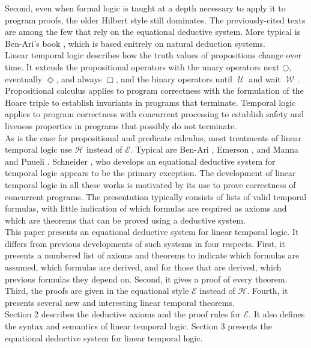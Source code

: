 \documentclass[fleqn, leqno]{article}
\newcommand{\Until}{\;\mathcal{U}\;}
\newcommand{\Wait}{\;\mathcal{W}\;}
\newcommand{\Next}{\bigcirc}
\newcommand{\Event}{\Diamond}
\newcommand{\Always}{\Box}
\begin{document}
Second, even when formal logic is taught at a depth necessary to apply it to program proofs, the older Hilbert style
still dominates.
The previously-cited texts \cite{Cohen, LADM, Kald} are among the few that rely on the equational deductive system. 
More typical is Ben-Ari's book \cite{Ben}, which is based enitrely on natural deduction systems.\\

Linear temporal logic describes how the truth values of propositions change over time.
It extends the propositional operators with the unary operators next $\Next$, eventually $\Event$, and always $\Always$,
and the binary operators until $\Until$ and wait $\Wait$.
Propositional calculus applies to program correctness with the formulation of the Hoare triple to establish invariants
in programs that terminate.
Temporal logic applies to program correctness with concurrent processing to establish safety and liveness properties
in programs that possibly do not terminate.\\

As is the case for propositional and predicate calculus, most treatments of linear temporal logic use $\mathcal{H}$
instead of $\mathcal{E}$. Typical are Ben-Ari \cite{Ben2}, Emerson \cite{Emer}, and Manna and Pnueli \cite{Manna}.
Schneider \cite{Schn}, who develops an equational deductive system for temporal logic appears to be the primary exception.
The development of linear temporal logic in all these works is motivated by its use to prove correctness of concurrent programs.
The presentation typically consists of lists of valid temporal formulas, with little indication of which formulas are required
as axioms and which are theorems that can be proved using a deductive system.\\

This paper presents an equational deductive system for linear temporal logic.
It differs from previous developments of such systems in four respects.
First, it presents a numbered list of axioms and theorems to indicate which formulas are assumed, which formulas are
derived, and for those that are derived, which previous formulas they depend on.
Second, it gives a proof of every theorem.
Third, the proofs are given in the equational style $\mathcal{E}$ instead of $\mathcal{H}$.
Fourth, it presents several new and interesting linear temporal theorems.\\

Section 2 describes the deductive axioms and the proof rules for $\mathcal{E}$.
It also defines the syntax and semantics of linear temporal logic.
Section 3 presents the equational deductive system for linear temporal logic.\\
\end{document}
